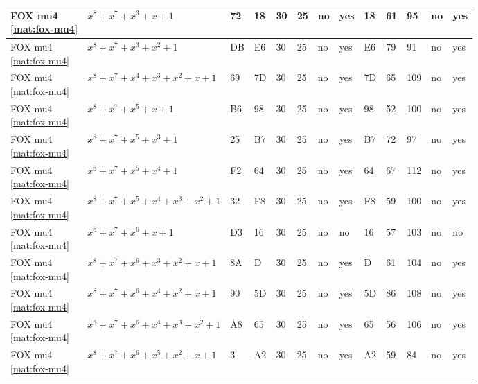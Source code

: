 \begin{tiny}
\begin{longtable}{|l|l|l|l|l|l|l|l|l|l|l|l|l|}
\shortstack{FOX mu4 \\ \eqref{mat:fox-mu4}} & $x^8 + x^7 + x^3 + x + 1$ & 72 & 18 & 30 & 25 & no & yes & 18 & 61 & 95 & no & yes \\ \hline
\shortstack{FOX mu4 \\ \eqref{mat:fox-mu4}} & $x^8 + x^7 + x^3 + x^2 + 1$ & DB & E6 & 30 & 25 & no & yes & E6 & 79 & 91 & no & yes \\ \hline
\shortstack{FOX mu4 \\ \eqref{mat:fox-mu4}} & $x^8 + x^7 + x^4 + x^3 + x^2 + x + 1$ & 69 & 7D & 30 & 25 & no & yes & 7D & 65 & 109 & no & yes \\ \hline
\shortstack{FOX mu4 \\ \eqref{mat:fox-mu4}} & $x^8 + x^7 + x^5 + x + 1$ & B6 & 98 & 30 & 25 & no & yes & 98 & 52 & 100 & no & yes \\ \hline
\shortstack{FOX mu4 \\ \eqref{mat:fox-mu4}} & $x^8 + x^7 + x^5 + x^3 + 1$ & 25 & B7 & 30 & 25 & no & yes & B7 & 72 & 97 & no & yes \\ \hline
\shortstack{FOX mu4 \\ \eqref{mat:fox-mu4}} & $x^8 + x^7 + x^5 + x^4 + 1$ & F2 & 64 & 30 & 25 & no & yes & 64 & 67 & 112 & no & yes \\ \hline
\shortstack{FOX mu4 \\ \eqref{mat:fox-mu4}} & $x^8 + x^7 + x^5 + x^4 + x^3 + x^2 + 1$ & 32 & F8 & 30 & 25 & no & yes & F8 & 59 & 100 & no & yes \\ \hline
\shortstack{FOX mu4 \\ \eqref{mat:fox-mu4}} & $x^8 + x^7 + x^6 + x + 1$ & D3 & 16 & 30 & 25 & no & no & 16 & 57 & 103 & no & no \\ \hline
\shortstack{FOX mu4 \\ \eqref{mat:fox-mu4}} & $x^8 + x^7 + x^6 + x^3 + x^2 + x + 1$ & 8A & D & 30 & 25 & no & yes & D & 61 & 104 & no & yes \\ \hline
\shortstack{FOX mu4 \\ \eqref{mat:fox-mu4}} & $x^8 + x^7 + x^6 + x^4 + x^2 + x + 1$ & 90 & 5D & 30 & 25 & no & yes & 5D & 86 & 108 & no & yes \\ \hline
\shortstack{FOX mu4 \\ \eqref{mat:fox-mu4}} & $x^8 + x^7 + x^6 + x^4 + x^3 + x^2 + 1$ & A8 & 65 & 30 & 25 & no & yes & 65 & 56 & 106 & no & yes \\ \hline
\shortstack{FOX mu4 \\ \eqref{mat:fox-mu4}} & $x^8 + x^7 + x^6 + x^5 + x^2 + x + 1$ & 3 & A2 & 30 & 25 & no & yes & A2 & 59 & 84 & no & yes \\ \hline

\end{longtable}
\end{tiny}
